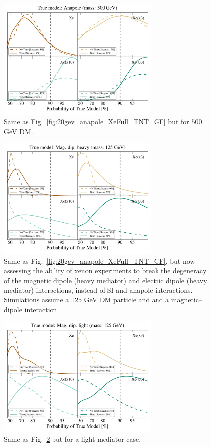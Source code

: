 \documentclass[11pt]{article}
\newcommand{\Fig}[1]{Fig.~\ref{#1}} \newcommand{\Figs}[2]{Figs.~\ref{#1} and \ref{#2}}
\begin{document}
\begin{figure}
\centering
\includegraphics[width=0.7\textwidth]{plots/PDF_500GeV_Anapole_50sims_Xe_Xe3x_Xe10x_XeG3_GF_TNT.pdf}
\caption{\label{fig:500gev_anapole_XeFull_TNT_GF}
Same as Fig.~\ref{fig:20gev_anapole_XeFull_TNT_GF} but for $500$ GeV DM.}
\end{figure}
\begin{figure}
\centering
\includegraphics[width=0.7\textwidth]{plots/PDF_125GeV_Magdipheavy_50sims_Xe_Xe3x_Xe10x_XeG3_GF_TNT.pdf}
\caption{\label{fig:125gev_Mag.dip.heavy_XeFull_TNT_GF}
Same as Fig.~\ref{fig:20gev_anapole_XeFull_TNT_GF}, but now assessing the ability of xenon experiments to break the degeneracy of the magnetic dipole (heavy mediator) and electric dipole (heavy mediator) interactions, instead of SI and anapole interactions. Simulations assume a $125$ GeV DM particle and and a magnetic--dipole interaction.}
\end{figure}
\begin{figure}
\centering
\includegraphics[width=0.7\textwidth]{plots/PDF_125GeV_Magdiplight_50sims_Xe_Xe3x_Xe10x_XeG3_GF_TNT.pdf}
\caption{\label{fig:125gev_Mag.dip.light_XeFull_TNT_GF}
Same as \Fig{fig:125gev_Mag.dip.heavy_XeFull_TNT_GF} but for a light mediator case. }
\end{figure}
\end{document}
